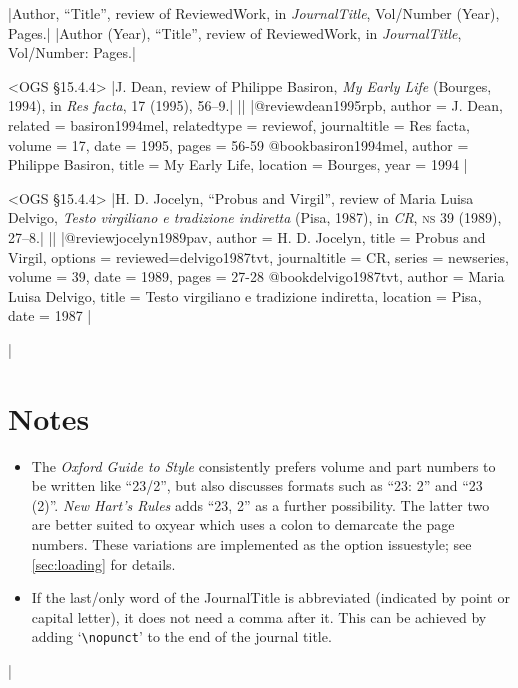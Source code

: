 \documentclass[extrafontsizes,11pt,a4paper,oneside]{memoir}
\newcommand*{\lit}[1]{\textsf{#1}}
\newcommand*{\code}[1]{`\texttt{#1}'}
\begin{document}
\specs
|Author, \enquote{Title}, \lit{review of} ReviewedWork, \lit{in} \emph{JournalTitle}, Vol/Number (Year), Pages.|%
|Author (Year), \enquote{Title}, \lit{review of} ReviewedWork, \lit{in} \emph{JournalTitle}, Vol/Number: Pages.|

\bibexample<OGS \S15.4.4>
|J. Dean, review of Philippe Basiron, \emph{My Early Life} (Bourges, 1994), in \emph{Res facta}, 17 (1995), 56--9.|%
||%
|@review{dean1995rpb,
  author = {J. Dean},
  related = {basiron1994mel},
  relatedtype = {reviewof},
  journaltitle = {Res facta},
  volume = {17},
  date = {1995},
  pages = {56-59}
}
@book{basiron1994mel,
  author = {Philippe Basiron},
  title = {My Early Life},
  location = {Bourges},
  year = {1994}
}|

\bibexample<OGS \S15.4.4>
|H. D. Jocelyn, \enquote{Probus and Virgil}, review of Maria Luisa Delvigo, \emph{Testo virgiliano e tradizione indiretta} (Pisa, 1987), in \emph{CR}, \textsc{ns} 39 (1989), 27--8.|%
||%
|@review{jocelyn1989pav,
  author = {H. D. Jocelyn},
  title = {Probus and Virgil},
  options = {reviewed=delvigo1987tvt},
  journaltitle = {CR},
  series = {newseries},
  volume = {39},
  date = {1989},
  pages = {27-28}
}
@book{delvigo1987tvt,
  author = {Maria Luisa Delvigo},
  title = {Testo virgiliano e tradizione indiretta},
  location = {Pisa},
  date = {1987}
}|


\todoc|
\section{Notes}

\begin{itemize}
  \item The \emph{Oxford Guide to Style} consistently prefers volume and part numbers to be written like \enquote{23/2}, but also discusses formats such as \enquote{23: 2} and \enquote{23 (2)}. \emph{New Hart's Rules} adds \enquote{23, 2} as a further possibility. The latter two are better suited to \textsf{oxyear} which uses a colon to demarcate the page numbers. These variations are implemented as the option \textsf{issuestyle}; see \autoref{sec:loading} for details.
  
  \item If the last\slash only word of the JournalTitle is abbreviated (indicated by point or capital letter), it does not need a comma after it. This can be achieved by adding \code{\textbackslash nopunct} to the end of the journal title.
\end{itemize}
|
\end{document}
